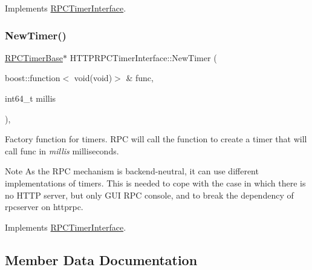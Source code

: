 Implements \mbox{\hyperlink{class_r_p_c_timer_interface_afbb7a79b18bdbc1a6900ba8eb882c5b3}{R\+P\+C\+Timer\+Interface}}.

\mbox{\label{class_h_t_t_p_r_p_c_timer_interface_a20f33383f0462c4898cc7c9641dc7fa7}} 
\subsubsection{\texorpdfstring{New\+Timer()}{NewTimer()}}
{\footnotesize\ttfamily \mbox{\hyperlink{class_r_p_c_timer_base}{R\+P\+C\+Timer\+Base}}$\ast$ H\+T\+T\+P\+R\+P\+C\+Timer\+Interface\+::\+New\+Timer (\begin{DoxyParamCaption}\item[{boost\+::function$<$ void(void)$>$ \&}]{func,  }\item[{int64\+\_\+t}]{millis }\end{DoxyParamCaption})\hspace{0.3cm}{\ttfamily [inline]}, {\ttfamily [virtual]}}

Factory function for timers. R\+PC will call the function to create a timer that will call func in {\itshape millis} milliseconds. \begin{DoxyNote}{Note}
As the R\+PC mechanism is backend-\/neutral, it can use different implementations of timers. This is needed to cope with the case in which there is no H\+T\+TP server, but only G\+UI R\+PC console, and to break the dependency of rpcserver on httprpc. 
\end{DoxyNote}


Implements \mbox{\hyperlink{class_r_p_c_timer_interface_a4588767c14008834cb7f035a3f2de2e9}{R\+P\+C\+Timer\+Interface}}.



\subsection{Member Data Documentation}
\mbox{\label{class_h_t_t_p_r_p_c_timer_interface_aceb824988e2613856a47bc1246ece4e9}} 
